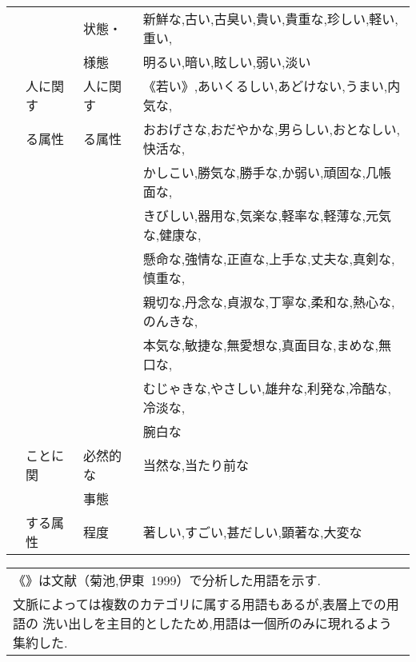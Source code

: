 {\begin{center}
\begin{tabular}{|c|l|l|l|}
& & 状態・ &
	新鮮な,古い,古臭い,貴い,貴重な,珍しい,軽い,重い,\\
& & 様態 &
 	明るい,暗い,眩しい,弱い,淡い\\ \cline{2-4}
& 人に関す & 人に関す &
	《若い》,あいくるしい,あどけない,うまい,内気な,\\
& る属性   & る属性 &
	おおげさな,おだやかな,男らしい,おとなしい,快活な,\\
& & & 	かしこい,勝気な,勝手な,か弱い,頑固な,几帳面な,\\
& & & 	きびしい,器用な,気楽な,軽率な,軽薄な,元気な,健康な,\\
& & & 	懸命な,強情な,正直な,上手な,丈夫な,真剣な,慎重な,\\
& & & 	親切な,丹念な,貞淑な,丁寧な,柔和な,熱心な,のんきな,\\
& & & 	本気な,敏捷な,無愛想な,真面目な,まめな,無口な,\\
& & & 	むじゃきな,やさしい,雄弁な,利発な,冷酷な,冷淡な,\\
& & &   腕白な\\ \cline{2-4}
& ことに関 & 必然的な &
	当然な,当たり前な\\ 
& & 事態 & \\ \cline{3-4}
& する属性 & 程度 &
	著しい,すごい,甚だしい,顕著な,大変な\\ \hline
\end{tabular}
\begin{tabular}{p{}}
《》は文献（菊池,伊東~1999）で分析した用語を示す.\\
文脈によっては複数のカテゴリに属する用語もあるが,表層上での用語の
洗い出しを主目的としたため,用語は一個所のみに現れるよう集約した.
\end{tabular}
\end{center}}
\newpage

\nocite{Kikuchi1999i,Nishio1972,Tanaka1980,Ogino1987}




\begin{biography}



\end{biography}


